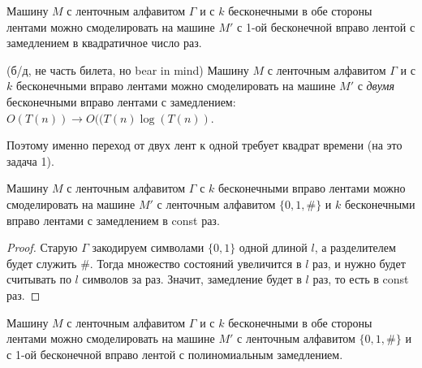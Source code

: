 \begin{corollary} Машину $M$ с ленточным алфавитом $\Gamma$ и с $k$ бесконечными в обе стороны лентами можно смоделировать на машине $M'$ с 1-ой бесконечной вправо лентой с замедлением в квадратичное число раз.
\end{corollary}

\begin{lemmanote} (б/д, не часть билета, но bear in mind) Машину $M$ с ленточным алфавитом $\Gamma$ и с $k$ бесконечными вправо лентами можно смоделировать на машине $M'$ с \emph{двумя} бесконечными вправо лентами с замедлением: $O(T(n)) \rightarrow O((T(n)\log(T(n))$.

Поэтому именно переход от двух лент к одной требует квадрат времени (на это задача 1).
\end{lemmanote}


\begin{lemma} Машину $M$ с ленточным алфавитом $\Gamma$ с $k$ бесконечными вправо лентами можно смоделировать на машине $M'$ с ленточным алфавитом $\{0, 1, \#\}$ и $k$ бесконечными вправо лентами с замедлением в const раз.
\end{lemma}

\begin{proof} Старую $\Gamma$ закодируем символами $\{0, 1\}$ одной длиной $l$, а разделителем будет служить $\#$. Тогда множество состояний увеличится в $l$ раз, и нужно будет считывать по $l$ символов за раз. Значит, замедление будет в $l$ раз, то есть в const раз.
\end{proof}

\begin{corollary} Машину $M$ с ленточным алфавитом $\Gamma$ и с $k$ бесконечными в обе стороны лентами можно смоделировать на машине $M'$ с ленточным алфавитом $\{0, 1, \#\}$ и с 1-ой бесконечной вправо лентой с полиномиальным замедлением.
\end{corollary}



